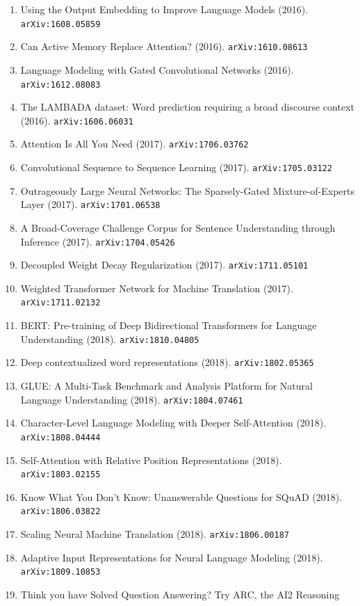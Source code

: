 \documentclass[11pt]{article}
\begin{document}
\begin{enumerate}
  \item Using the Output Embedding to Improve Language Models (2016). \texttt{arXiv:1608.05859}
  \item Can Active Memory Replace Attention? (2016). \texttt{arXiv:1610.08613}
  \item Language Modeling with Gated Convolutional Networks (2016). \texttt{arXiv:1612.08083}
  \item The LAMBADA dataset: Word prediction requiring a broad discourse context (2016). \texttt{arXiv:1606.06031}
  \item Attention Is All You Need (2017). \texttt{arXiv:1706.03762}
  \item Convolutional Sequence to Sequence Learning (2017). \texttt{arXiv:1705.03122}
  \item Outrageously Large Neural Networks: The Sparsely-Gated
  Mixture-of-Experts Layer (2017). \texttt{arXiv:1701.06538}
  \item A Broad-Coverage Challenge Corpus for Sentence Understanding through
  Inference (2017). \texttt{arXiv:1704.05426}
  \item Decoupled Weight Decay Regularization (2017). \texttt{arXiv:1711.05101}
  \item Weighted Transformer Network for Machine Translation (2017). \texttt{arXiv:1711.02132}
  \item BERT: Pre-training of Deep Bidirectional Transformers for Language
  Understanding (2018). \texttt{arXiv:1810.04805}
  \item Deep contextualized word representations (2018). \texttt{arXiv:1802.05365}
  \item GLUE: A Multi-Task Benchmark and Analysis Platform for Natural Language
  Understanding (2018). \texttt{arXiv:1804.07461}
  \item Character-Level Language Modeling with Deeper Self-Attention (2018). \texttt{arXiv:1808.04444}
  \item Self-Attention with Relative Position Representations (2018). \texttt{arXiv:1803.02155}
  \item Know What You Don't Know: Unanswerable Questions for SQuAD (2018). \texttt{arXiv:1806.03822}
  \item Scaling Neural Machine Translation (2018). \texttt{arXiv:1806.00187}
  \item Adaptive Input Representations for Neural Language Modeling (2018). \texttt{arXiv:1809.10853}
  \item Think you have Solved Question Answering? Try ARC, the AI2 Reasoning

\end{enumerate}
\end{document}
